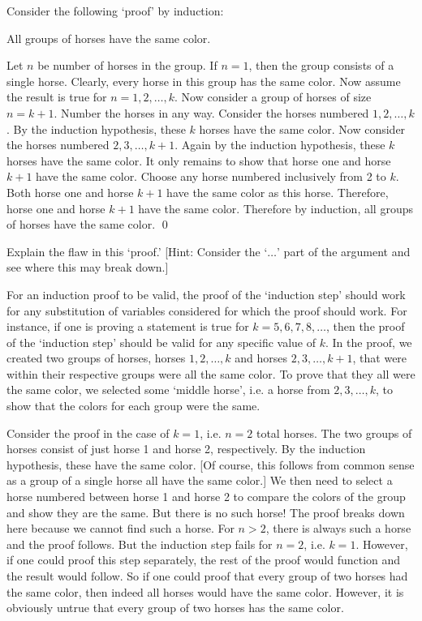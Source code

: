 \documentclass[11pt,letterpaper]{article}
\begin{document}

 Consider the following `proof' by induction: \pspace

\begin{prop}
All groups of horses have the same color.
\end{prop}

\pf Let $n$ be number of horses in the group. If $n= 1$, then the group consists of a single horse. Clearly, every horse in this group has the same color. Now assume the result is true for $n= 1, 2, \ldots, k$. Now consider a group of horses of size $n= k + 1$. Number the horses in any way. Consider the horses numbered $1, 2, \ldots, k$. By the induction hypothesis, these $k$ horses have the same color. Now consider the horses numbered $2, 3, \ldots, k + 1$.  Again by the induction hypothesis, these $k$ horses have the same color. It only remains to show that horse one and horse $k + 1$ have the same color. Choose any horse numbered inclusively from 2 to $k$. Both horse one and horse $k + 1$ have the same color as this horse. Therefore, horse one and horse $k + 1$ have the same color. Therefore by induction, all groups of horses have the same color. \qed \pspace

Explain the flaw in this `proof.' [Hint: Consider the `$\ldots$' part of the argument and see where this may break down.] \pspace

\sol For an induction proof to be valid, the proof of the `induction step' should work for any substitution of variables considered for which the proof should work. For instance, if one is proving a statement is true for $k= 5, 6, 7, 8, \ldots$, then the proof of the `induction step' should be valid for any specific value of $k$. In the proof, we created two groups of horses, horses $1, 2, \ldots, k$ and horses $2, 3, \ldots, k + 1$, that were within their respective groups were all the same color. To prove that they all were the same color, we selected some `middle horse', i.e. a horse from $2, 3, \ldots, k$, to show that the colors for each group were the same. \pspace

Consider the proof in the case of $k= 1$, i.e. $n= 2$ total horses. The two groups of horses consist of just horse 1 and horse 2, respectively. By the induction hypothesis, these have the same color. [Of course, this follows from common sense as a group of a single horse all have the same color.] We then need to select a horse numbered between horse 1 and horse 2 to compare the colors of the group and show they are the same. But there is no such horse! The proof breaks down here because we cannot find such a horse. For $n > 2$, there is always such a horse and the proof follows. But the induction step fails for $n = 2$, i.e. $k= 1$. However, if one could proof this step separately, the rest of the proof would function and the result would follow. So if one could proof that every group of two horses had the same color, then indeed all horses would have the same color. However, it is obviously untrue that every group of two horses has the same color. 
\end{document}
